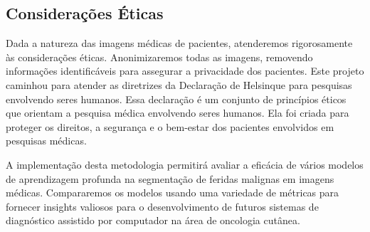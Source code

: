 \subsection{Considerações Éticas}
    Dada a natureza das imagens médicas de pacientes, atenderemos rigorosamente às considerações éticas. Anonimizaremos todas as imagens, removendo informações identificáveis para assegurar a privacidade dos pacientes. Este projeto caminhou para atender as diretrizes da Declaração de Helsinque para pesquisas envolvendo seres humanos. Essa declaração é um conjunto de princípios éticos que orientam a pesquisa médica envolvendo seres humanos. Ela foi criada para proteger os direitos, a segurança e o bem-estar dos pacientes envolvidos em pesquisas médicas.
    
    A implementação desta metodologia permitirá avaliar a eficácia de vários modelos de aprendizagem profunda na segmentação de feridas malignas em imagens médicas. Compararemos os modelos usando uma variedade de métricas para fornecer insights valiosos para o desenvolvimento de futuros sistemas de diagnóstico assistido por computador na área de oncologia cutânea.

